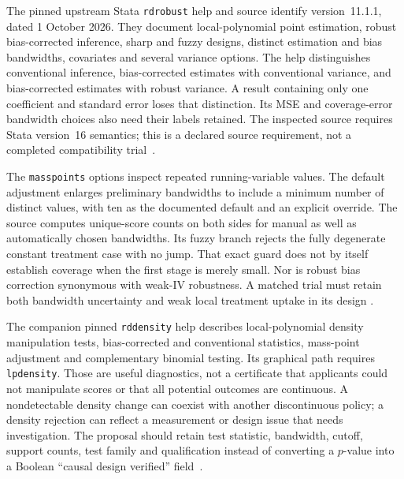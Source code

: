 The pinned upstream Stata \texttt{rdrobust} help and source identify
version~11.1.1, dated 1 October 2026. They document local-polynomial
point estimation, robust bias-corrected inference, sharp and fuzzy
designs, distinct estimation and bias bandwidths, covariates and several
variance options. The help distinguishes conventional inference,
bias-corrected estimates with conventional variance, and bias-corrected
estimates with robust variance. A result containing only one coefficient
and standard error loses that distinction. Its MSE and coverage-error
bandwidth choices also need their labels retained. The inspected source
requires Stata version~16 semantics; this is a declared source requirement,
not a completed compatibility trial~\citep{exec13_ivrd_rdrobust}.

The \texttt{masspoints} options inspect repeated running-variable values.
The default adjustment enlarges preliminary bandwidths to include a
minimum number of distinct values, with ten as the documented default
and an explicit override. The source computes unique-score counts on
both sides for manual as well as automatically chosen bandwidths.
Its fuzzy branch rejects the fully degenerate constant treatment case
with no jump. That exact guard does not by itself establish coverage
when the first stage is merely small. Nor is robust bias correction
synonymous with weak-IV robustness. A matched trial must retain both
bandwidth uncertainty and weak local treatment uptake in its design
\citep{exec13_ivrd_rdrobust}.

The companion pinned \texttt{rddensity} help describes local-polynomial
density manipulation tests, bias-corrected and conventional statistics,
mass-point adjustment and complementary binomial testing. Its graphical
path requires \texttt{lpdensity}. Those are useful diagnostics, not a
certificate that applicants could not manipulate scores or that all
potential outcomes are continuous. A nondetectable density change can
coexist with another discontinuous policy; a density rejection can
reflect a measurement or design issue that needs investigation. The
proposal should retain test statistic, bandwidth, cutoff, support counts,
test family and qualification instead of converting a $p$-value into
a Boolean ``causal design verified'' field~\citep{exec13_ivrd_rddensity}.

